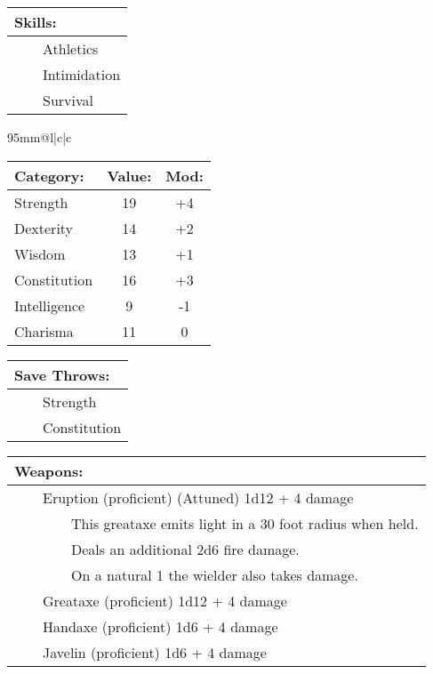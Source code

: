 \documentclass[11pt]{article}
\newcommand{\tabitem}{~~\llap{--}~~}
\newcommand{\tabtabitem}{~~~~~~\llap{$\bullet$}~~}
\begin{document}
\begin{multicols}{2}
\vspace{2mm}

\noindent \begin{tabularx}{95mm}{@{}l}
{\Large \textbf{Skills:}} \\
\hline
\tabitem Athletics \\
\tabitem Intimidation \\
\tabitem Survival
		\end{tabularx}

\vspace{4mm}

\noindent \begin{tabularx}{95mm}{@{}l|c|c}
 \\
\hline
		\end{tabularx}
\noindent \begin{tabular}{@{}l|c|c}
\textbf{Category:} 			& \textbf{Value:} 	& \textbf{Mod:} \\
\hline
Strength 					& 19 				& +4		\\
Dexterity 					& 14 				& +2		\\
Wisdom 						& 13				& +1		\\
Constitution 				& 16 				& +3		\\
Intelligence 				& 9 				& -1		\\
Charisma 					& 11 				& 0
		\end{tabular}

\vspace{4mm}

\noindent \begin{tabularx}{95mm}{@{}l}
{\Large \textbf{Save Throws:}} \\
\hline
\tabitem Strength \\
\tabitem Constitution
		\end{tabularx}

\vspace{4mm}

\noindent \begin{tabularx}{95mm}{@{}l}
{\Large \textbf{Weapons:}} \\
\hline
\tabitem Eruption (proficient) (Attuned) 1d12 + 4 damage \\
\tabtabitem This greataxe emits light in a 30 foot radius when held. \\
\tabtabitem Deals an additional 2d6 fire damage. \\
\tabtabitem On a natural 1 the wielder also takes damage. \\
\tabitem Greataxe (proficient) 1d12 + 4 damage \\
\tabitem Handaxe (proficient) 1d6 + 4 damage \\
\tabitem Javelin (proficient) 1d6 + 4 damage
		\end{tabularx}


\end{multicols}
\end{document}
